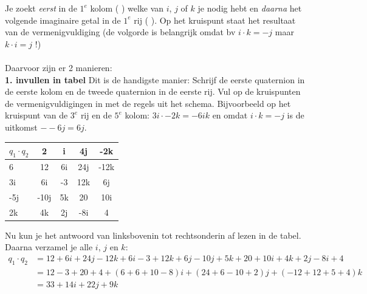 Je zoekt \textit{eerst} in de $ 1^e $ kolom ( ) welke van $i$, $j$ of $k$ je nodig hebt en \textit{daarna} het volgende  imaginaire getal in de $ 1^e $ rij ( ).  Op het kruispunt staat het resultaat van de vermenigvuldiging (de volgorde is belangrijk omdat bv $  i\cdot k = -j $ maar $ k\cdot i = j  $ !) \\ \\
Daarvoor zijn er 2 manieren:\\

\textbf{1. invullen in tabel} Dit is de handigste manier:  Schrijf de eerste quaternion in de eerste kolom en de tweede quaternion in de eerste rij. Vul op de kruispunten de 
vermenigvuldigingen in met de  regels uit het schema. Bijvoorbeeld op het kruispunt van de $ 3^e $ rij en de $   5^e $ kolom: $  3i\cdot -2k = -6ik   $ en omdat $ i\cdot k = -j $ is de uitkomst $ --6j = 6j $. 
\begin{center}
	\begin{tabular}{ | l || c | c |c |c |}
		\hline
		$ q_1\cdot q_2 $& 2 & i & 4j & -2k \\ \hline \hline
		6 & 12 & 6i & 24j & -12k  \\ \hline
		3i & 6i & -3 & 12k & 6j\\ \hline
		-5j & -10j &  5k & 20 & 10i\\ \hline
		2k & 4k & 2j & -8i & 4\\ 
		\hline 
	\end{tabular}
\end{center}
Nu kun je het antwoord van linksbovenin tot rechtsonderin af lezen in de tabel. Daarna verzamel je  alle $i$, $j$ en $k$:
\begin{align*}
    q_1\cdot q_2 &= 12 + 6i + 24j - 12k + 6i - 3 + 12k + 6j - 10j + 5k + 20 + 10i + 4k + 2j - 8i + 4 \\
                 & = 12 - 3 + 20 + 4 + (6 + 6 + 10 - 8)i +(24 + 6 - 10 + 2)j +(-12 + 12 + 5 + 4)k \\
                 & = 33 + 14i + 22j + 9k \\
\end{align*}

